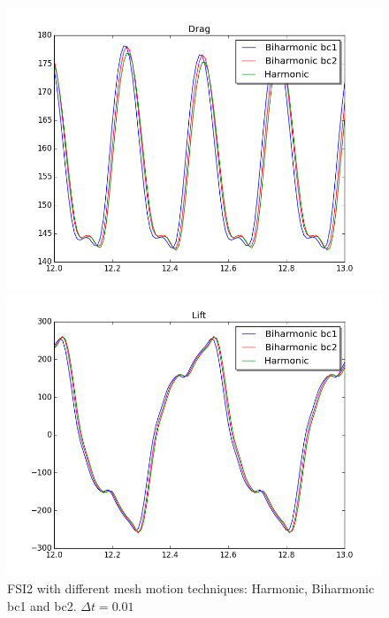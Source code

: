 \begin{figure}[H]
\begin{minipage}[b]{0.5\linewidth}
    \centering
    \includegraphics[scale=0.35]{./Verification_Validation/Mesh_motion_results/FSI2_dt001_drag.png} 
    \vspace{4ex}
  \end{minipage}%
  \begin{minipage}[b]{0.5\linewidth}
    \centering
    \includegraphics[scale=0.35]{./Verification_Validation/Mesh_motion_results/FSI2_dt001_lift.png} 
    \vspace{4ex}
  \end{minipage} 
\caption {FSI2 with different mesh motion techniques: Harmonic, Biharmonic bc1 and bc2. $\Delta t = 0.01$}
\end{figure}







